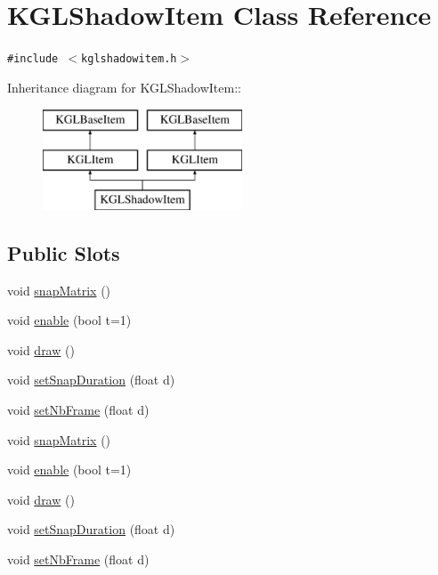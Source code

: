 \hypertarget{class_k_g_l_shadow_item}{
\section{KGLShadowItem Class Reference}
\label{class_k_g_l_shadow_item}
}
{\tt \#include $<$kglshadowitem.h$>$}

Inheritance diagram for KGLShadowItem::\begin{figure}[H]
\begin{center}
\leavevmode
\includegraphics[height=3cm]{class_k_g_l_shadow_item}
\end{center}
\end{figure}
\subsection*{Public Slots}
\begin{CompactItemize}
\item 
void \hyperlink{class_k_g_l_shadow_item_e597951a632787a9f9ada111a051db8a}{snapMatrix} ()
\item 
void \hyperlink{class_k_g_l_shadow_item_936437c9a0cf323cb580e0697fd10b6e}{enable} (bool t=1)
\item 
void \hyperlink{class_k_g_l_shadow_item_97433b863559d8f38199fe68a5b21bcc}{draw} ()
\item 
void \hyperlink{class_k_g_l_shadow_item_0aa1f4701dc69f8b4972d9a5e6b22e1e}{setSnapDuration} (float d)
\item 
void \hyperlink{class_k_g_l_shadow_item_b337d40ec80798586d13a96d648c5b6c}{setNbFrame} (float d)
\item 
void \hyperlink{class_k_g_l_shadow_item_e597951a632787a9f9ada111a051db8a}{snapMatrix} ()
\item 
void \hyperlink{class_k_g_l_shadow_item_936437c9a0cf323cb580e0697fd10b6e}{enable} (bool t=1)
\item 
void \hyperlink{class_k_g_l_shadow_item_97433b863559d8f38199fe68a5b21bcc}{draw} ()
\item 
void \hyperlink{class_k_g_l_shadow_item_0aa1f4701dc69f8b4972d9a5e6b22e1e}{setSnapDuration} (float d)
\item 
void \hyperlink{class_k_g_l_shadow_item_b337d40ec80798586d13a96d648c5b6c}{setNbFrame} (float d)
\end{CompactItemize}
